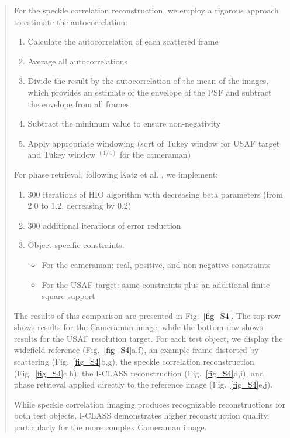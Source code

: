\documentclass[12pt]{article}
\newenvironment{ourresponse}
    {\begin{tcolorbox}[width=\linewidth,breakable,enhanced,colback=gray!5,colframe=responsecolor!50,title=Response,left=5pt,right=5pt]}
    {\end{tcolorbox}}
\begin{document}
\begin{ourresponse}
\begin{quote}
        For the speckle correlation reconstruction, we employ a rigorous approach to estimate the autocorrelation:
        \begin{enumerate}
            \item Calculate the autocorrelation of each scattered frame
            \item Average all autocorrelations
            \item Divide the result by the autocorrelation of the mean of the images, which provides an estimate of the envelope of the PSF and subtract the envelope from all frames
            \item Subtract the minimum value to ensure non-negativity
            \item Apply appropriate windowing (sqrt of Tukey window for USAF target and Tukey window $^{(1/4)}$ for the cameraman)
        \end{enumerate}
        
        For phase retrieval, following Katz et al. \cite{katz14}, we implement:
        \begin{enumerate}
            \item 300 iterations of HIO algorithm with decreasing beta parameters (from 2.0 to 1.2, decreasing by 0.2)
            \item 300 additional iterations of error reduction
            \item Object-specific constraints:
            \begin{itemize}
                \item For the cameraman: real, positive, and non-negative constraints
                \item For the USAF target: same constraints plus an additional finite square support
            \end{itemize}
        \end{enumerate}
        
        The results of this comparison are presented in Fig.~\ref{fig_S4}. The top row shows results for the Cameraman image, while the bottom row shows results for the USAF resolution target. For each test object, we display the widefield reference (Fig.~\ref{fig_S4}a,f), an example frame distorted by scattering (Fig.~\ref{fig_S4}b,g), the speckle correlation reconstruction (Fig.~\ref{fig_S4}c,h), the I-CLASS reconstruction (Fig.~\ref{fig_S4}d,i), and phase retrieval applied directly to the reference image (Fig.~\ref{fig_S4}e,j).
        
        While speckle correlation imaging produces recognizable reconstructions for both test objects, I-CLASS demonstrates higher reconstruction quality, particularly for the more complex Cameraman image.


\end{quote}
\end{ourresponse}
\end{document}
